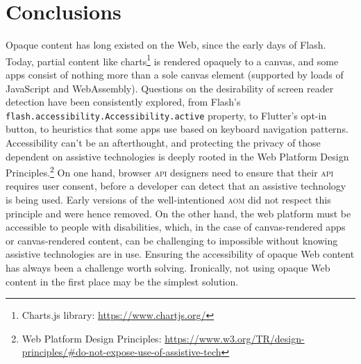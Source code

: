 \documentclass[sigconf]{acmart}
\begin{document}
\section{Conclusions}

Opaque content has long existed on the Web, since the early days of Flash. Today, partial content like charts\footnote{Charts.js library: \url{https://www.chartjs.org/}} is rendered opaquely to a canvas, and some apps consist of nothing more than a sole canvas element (supported by loads of JavaScript and WebAssembly). Questions on the desirability of screen reader detection have been consistently explored, from Flash's \texttt{flash.accessibility.Accessibility.active} property, to Flutter's opt-in button, to heuristics that some apps use based on keyboard navigation patterns. Accessibility can't be an afterthought, and protecting the privacy of those dependent on assistive technologies is deeply rooted in the Web Platform Design Principles.\footnote{Web Platform Design Principles: \url{https://www.w3.org/TR/design-principles/#do-not-expose-use-of-assistive-tech}} On one hand, browser \textsc{api} designers need to ensure that their \textsc{api} requires user consent, before a developer can detect that an assistive technology is being used. Early versions of the well-intentioned \textsc{aom} did not respect this principle and were hence removed. On the other hand, the web platform must be accessible to people with disabilities, which, in the case of canvas-rendered apps or canvas-rendered content, can be challenging to impossible without knowing assistive technologies are in use. Ensuring the accessibility of opaque Web content has always been a challenge worth solving. Ironically, not using opaque Web content in the first place may be the simplest solution.
\end{document}
